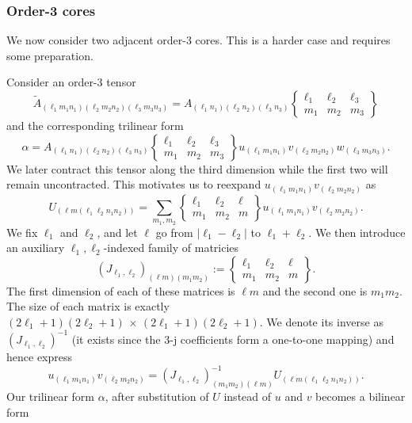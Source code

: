 \subsubsection{Order-3 cores}\label{sec:order-3-decompositions}
We now consider two adjacent order-3 cores.
This is a harder case and requires some preparation.

Consider an order-3 tensor
\[
\tilde{A}_{(\ell_1 m_1 n_1) (\ell_2 m_2 n_2) (\ell_3 m_3 n_3)}
=
A_{(\ell_1 n_1) (\ell_2 n_2) (\ell_3 n_3)}
\begin{Bmatrix}
    \ell_1 & \ell_2 & \ell_3 \\
    m_1 & m_2 & m_3
\end{Bmatrix}
\]
and the corresponding trilinear form
\[
\alpha
=
A_{(\ell_1 n_1) (\ell_2 n_2) (\ell_3 n_3)}
\begin{Bmatrix}
    \ell_1 & \ell_2 & \ell_3 \\
    m_1 & m_2 & m_3
\end{Bmatrix}
u_{(\ell_1 m_1 n_1)} v_{(\ell_2 m_2 n_2)} w_{(\ell_3 m_3 n_3)}.
\]
We later contract this tensor along the third dimension while the first two will remain uncontracted.
This motivates us to reexpand $u_{(\ell_1 m_1 n_1)} v_{(\ell_2 m_2 n_2)}$ as
\[
U_{(\ell m (\ell_1 \ell_2 n_1 n_2))} =
\sum_{m_1,m_2}
\begin{Bmatrix}
    \ell_1 & \ell_2 & \ell \\
    m_1 & m_2 & m
\end{Bmatrix}
u_{(\ell_1 m_1 n_1)} v_{(\ell_2 m_2 n_2)}.
\]
We fix $\ell_1$ and $\ell_2$, and let $\ell$ go from $|\ell_1-\ell_2|$ to $\ell_1 + \ell_2$.
We then introduce an auxiliary $\ell_1,\ell_2$-indexed family of matricies
\[
(J_{\ell_1,\ell_2})_{(\ell m)(m_1 m_2)}
:=
\begin{Bmatrix}
    \ell_1 & \ell_2 & \ell \\
    m_1 & m_2 & m
\end{Bmatrix}.
\]
The first dimension of each of these matrices is $\ell m$ and the second one is $m_1 m_2$.
The size of each matrix is exactly $(2\ell_1+1) (2\ell_2+1) \,\times\, (2\ell_1+1) (2\ell_2+1)$.
We denote its inverse as $(J_{\ell_1,\ell_2})^{-1}$ (it exists since the 3-j coefficients form a one-to-one mapping) and hence express
\[
u_{(\ell_1 m_1 n_1)} v_{(\ell_2 m_2 n_2)}
=
(J_{\ell_1,\ell_2})^{-1}_{(m_1 m_2)(\ell m)} U_{(\ell m (\ell_1 \ell_2 n_1 n_2))}.
\]
Our trilinear form $\alpha$, after substitution of $U$ instead of $u$ and $v$ becomes a bilinear form
